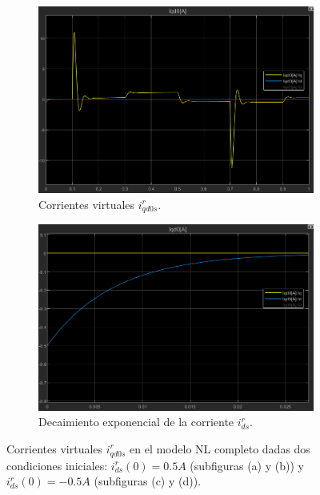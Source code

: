\documentclass{article}
\begin{document}
\begin{figure}[H]
    \vspace{0.5cm} %

    \begin{subfigure}[b]{0.42\textwidth}
        \centering
        \includegraphics[width=\textwidth]{Imagenes/CorrientesVirtualesId-0,5A.png}
        \caption{Corrientes virtuales \(i^r_{qd0s}\).}
        \label{fig:CorrientesVirtualesId-0.5A}
    \end{subfigure}
    \hfill
    \begin{subfigure}[b]{0.4\textwidth}
        \centering
        \includegraphics[width=\textwidth]{Imagenes/DecaimientoCorrienteId-0,5A.png}
        \caption{Decaimiento exponencial de la corriente \(i^r_{ds}\).}
        \label{fig:DecaimientoCorrienteId-0.5A}
    \end{subfigure}

    \caption{Corrientes virtuales \(i^r_{qd0s}\) en el modelo NL completo dadas dos condiciones iniciales: \(i^r_{ds}(0) = 0.5A\) (subfiguras (a) y (b)) y \(i^r_{ds}(0) = -0.5A\) (subfiguras (c) y (d)).}
    \label{fig:CorrientesVirtualesCondicionId}
\end{figure}
\end{document}
